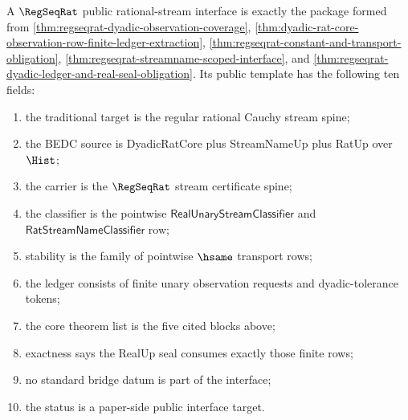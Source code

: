 \begin{theorem}
\label{thm:regseqrat-public-rational-stream-interface}
A $\RegSeqRat$ public rational-stream interface is exactly the package formed
from \autoref{thm:regseqrat-dyadic-observation-coverage},
\autoref{thm:dyadic-rat-core-observation-row-finite-ledger-extraction},
\autoref{thm:regseqrat-constant-and-transport-obligation},
\autoref{thm:regseqrat-streamname-scoped-interface}, and
\autoref{thm:regseqrat-dyadic-ledger-and-real-seal-obligation}. Its public
template has the following ten fields:
\begin{enumerate}
  \item the traditional target is the regular rational Cauchy stream spine;
  \item the BEDC source is DyadicRatCore plus StreamNameUp plus RatUp over
  $\Hist$;
  \item the carrier is the $\RegSeqRat$ stream certificate spine;
  \item the classifier is the pointwise
  $\mathsf{RealUnaryStreamClassifier}$ and
  $\mathsf{RatStreamNameClassifier}$ row;
  \item stability is the family of pointwise $\hsame$ transport rows;
  \item the ledger consists of finite unary observation requests and
  dyadic-tolerance tokens;
  \item the core theorem list is the five cited blocks above;
  \item exactness says the RealUp seal consumes exactly those finite rows;
  \item no standard bridge datum is part of the interface;
  \item the status is a paper-side public interface target.
\end{enumerate}
\end{theorem}
